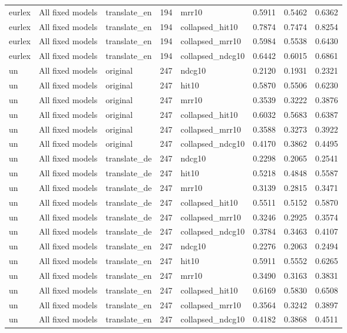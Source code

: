 \begin{tabular}{lllrlrrr}
eurlex & All fixed models & translate\_en & 194 & mrr10 & 0.5911 & 0.5462 & 0.6362 \\
eurlex & All fixed models & translate\_en & 194 & collapsed\_hit10 & 0.7874 & 0.7474 & 0.8254 \\
eurlex & All fixed models & translate\_en & 194 & collapsed\_mrr10 & 0.5984 & 0.5538 & 0.6430 \\
eurlex & All fixed models & translate\_en & 194 & collapsed\_ndcg10 & 0.6442 & 0.6015 & 0.6861 \\
un & All fixed models & original & 247 & ndcg10 & 0.2120 & 0.1931 & 0.2321 \\
un & All fixed models & original & 247 & hit10 & 0.5870 & 0.5506 & 0.6230 \\
un & All fixed models & original & 247 & mrr10 & 0.3539 & 0.3222 & 0.3876 \\
un & All fixed models & original & 247 & collapsed\_hit10 & 0.6032 & 0.5683 & 0.6387 \\
un & All fixed models & original & 247 & collapsed\_mrr10 & 0.3588 & 0.3273 & 0.3922 \\
un & All fixed models & original & 247 & collapsed\_ndcg10 & 0.4170 & 0.3862 & 0.4495 \\
un & All fixed models & translate\_de & 247 & ndcg10 & 0.2298 & 0.2065 & 0.2541 \\
un & All fixed models & translate\_de & 247 & hit10 & 0.5218 & 0.4848 & 0.5587 \\
un & All fixed models & translate\_de & 247 & mrr10 & 0.3139 & 0.2815 & 0.3471 \\
un & All fixed models & translate\_de & 247 & collapsed\_hit10 & 0.5511 & 0.5152 & 0.5870 \\
un & All fixed models & translate\_de & 247 & collapsed\_mrr10 & 0.3246 & 0.2925 & 0.3574 \\
un & All fixed models & translate\_de & 247 & collapsed\_ndcg10 & 0.3784 & 0.3463 & 0.4107 \\
un & All fixed models & translate\_en & 247 & ndcg10 & 0.2276 & 0.2063 & 0.2494 \\
un & All fixed models & translate\_en & 247 & hit10 & 0.5911 & 0.5552 & 0.6265 \\
un & All fixed models & translate\_en & 247 & mrr10 & 0.3490 & 0.3163 & 0.3831 \\
un & All fixed models & translate\_en & 247 & collapsed\_hit10 & 0.6169 & 0.5830 & 0.6508 \\
un & All fixed models & translate\_en & 247 & collapsed\_mrr10 & 0.3564 & 0.3242 & 0.3897 \\
un & All fixed models & translate\_en & 247 & collapsed\_ndcg10 & 0.4182 & 0.3868 & 0.4511 \\
\bottomrule
\end{tabular}
